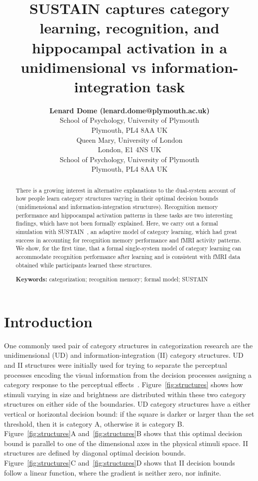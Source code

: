 \documentclass[10pt,letterpaper]{article}
\title{SUSTAIN captures category learning, recognition, and hippocampal activation
in a unidimensional vs information-integration task}
\author{{\large \bf Lenard Dome (lenard.dome@plymouth.ac.uk)} \\
  School of Psychology, University of Plymouth \\
  Plymouth,  PL4 8AA UK
  \AND{\large \bf Charlotte E. R. Edmunds (ceredmunds@gmail.com)} \\
  Queen Mary, University of London \\
  London, E1 4NS UK
  \AND{\large \bf Andy J. Wills (andy.wills@plymouth.ac.uk)} \\
  School of Psychology, University of Plymouth \\
  Plymouth, PL4 8AA UK}
\begin{document}
\maketitle

\begin{abstract}
There is a growing interest in alternative explanations to the dual-system
account of how people learn category structures varying in their optimal
decision bounds (unidimensional and information-integration structures).
Recognition memory performance and hippocampal activation patterns in these
tasks are two interesting findings, which have not been formally explained.
Here, we carry out a formal simulation with SUSTAIN~\cite{Love2004}, an
adaptive model of category learning, which had great success in accounting
for recognition memory performance and fMRI activity patterns. We show,
for the first time, that a formal single-system model of
category learning can accommodate recognition performance after learning and
is consistent with fMRI data obtained while participants learned these
structures.

\textbf{Keywords:}
categorization; recognition memory; formal model; SUSTAIN
\end{abstract}

\section{Introduction}

One commonly used pair of category structures in categorization research are
the unidimensional (UD) and information-integration (II) category structures.
UD and II structures were initially used for trying to separate the
perceptual processes encoding the visual
information from the decision processes assigning a category response to the
perceptual effects~\cite{ashby1988decision}. Figure~\ref{fig:structures} shows
how stimuli varying in size and brightness are distributed within these two
category structures on either side of the boundaries. UD category structures
have a either vertical or horizontal decision bound: if the square
is darker or larger than the set threshold, then it is category A, otherwise it is category B.
Figure~\ref{fig:structures}A and~\ref{fig:structures}B shows that this optimal decision
bound is parallel to one of the dimensional axes in the physical stimuli space.
II structures are defined by diagonal optimal decision bounds.
Figure~\ref{fig:structures}C and~\ref{fig:structures}D shows that II decision bounds follow a linear
function, where the gradient is neither zero, nor infinite.
\end{document}
